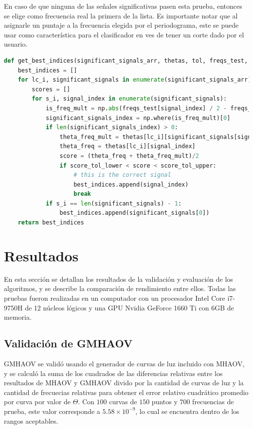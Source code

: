 En caso de que ninguna de las señales significativas pasen esta prueba, entonces se elige como frecuencia real la primera de la lista. Es importante notar que al asignarle un puntaje a la frecuencia elegida por el periodograma, este se puede usar como característica para el clasificador en ves de tener un corte dado por el usuario.
\begin{lstlisting}[language=Python]
    def get_best_indices(significant_signals_arr, thetas, tol, freqs_test, score_tol_lower=0, score_tol_upper=np.inf):
    best_indices = []
    for lc_i, significant_signals in enumerate(significant_signals_arr):
        scores = []
        for s_i, signal_index in enumerate(significant_signals):
            is_freq_mult = np.abs(freqs_test[signal_index] / 2 - freqs_test[significant_signals]) < tol
            significant_signals_index = np.where(is_freq_mult)[0]
            if len(significant_signals_index) > 0:
                theta_freq_mult = thetas[lc_i][significant_signals[significant_signals_index[0]]]
                theta_freq = thetas[lc_i][signal_index]
                score = (theta_freq + theta_freq_mult)/2
                if score_tol_lower < score < score_tol_upper:
                    # this is the correct signal
                    best_indices.append(signal_index)
                    break
            if s_i == len(significant_signals) - 1:
                best_indices.append(significant_signals[0])
    return best_indices
\end{lstlisting}


\chapter{Resultados}\label{chap:resultados}
En esta sección se detallan los resultados de la validación y evaluación de los algoritmos, y se describe la comparación de rendimiento entre ellos. Todas las pruebas fueron realizadas en un computador con un procesador Intel Core i7-9750H de 12 núcleos lógicos y una GPU Nvidia GeForce 1660 Ti con 6GB de memoria.
\section{Validación de GMHAOV}\label{sec:validacion}
GMHAOV se validó usando el generador de curvas de luz incluido con MHAOV, y se calculó la suma de los cuadrados de las diferencias relativas entre los resultados de MHAOV y GMHAOV divido por la cantidad de curvas de luz y la cantidad de frecuecias relativas para obtener el error relativo cuadrático promedio por curva por valor de $\Theta$. Con $100$ curvas de $150$ puntos y $700$ frecuencias de prueba, este valor corresponde a $5.58 \times 10^{-9}$, lo cual se encuentra dentro de los rangos aceptables.

